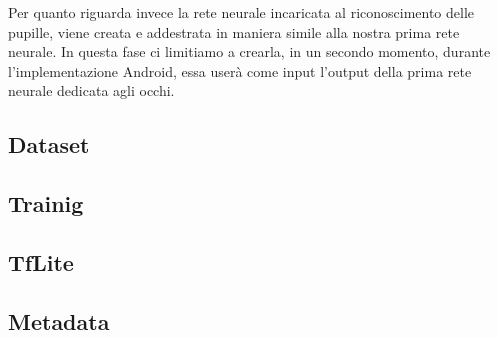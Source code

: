 Per quanto riguarda invece la rete neurale incaricata al riconoscimento delle pupille, viene creata e addestrata in maniera simile alla nostra prima rete neurale. In questa fase ci limitiamo a crearla, in un secondo momento, durante l'implementazione Android, essa userà come input l'output della prima rete neurale dedicata agli occhi.

\subsection{Dataset}
\label{sub:gazedataset}


\subsection{Trainig}
\label{sub:gazetraining}


\subsection{TfLite}
\label{sub:gazetflite}


\subsection{Metadata}
\label{sub:gazemetadata}
